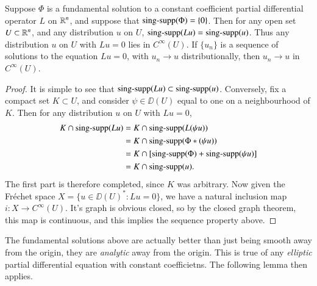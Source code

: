 \begin{lemma}
    Suppose $\Phi$ is a fundamental solution to a constant coefficient partial differential operator $L$ on $\operatorname{\mathbb{R}}^n$, and suppose that $\operatorname{\text{sing-supp}}(\Phi) = \{ 0 \}$. Then for any open set $U \subset \operatorname{\mathbb{R}}^n$, and any distribution $u$ on $U$, $\operatorname{\text{sing-supp}}(Lu) = \operatorname{\text{sing-supp}}(u)$. Thus any distribution $u$ on $U$ with $Lu = 0$ lies in $C^\infty(U)$. If $\{ u_n \}$ is a sequence of solutions to the equation $Lu = 0$, with $u_n \to u$ distributionally, then $u_n \to u$ in $C^\infty(U)$.
\end{lemma}
\begin{proof}
    It is simple to see that $\operatorname{\text{sing-supp}}(Lu) \subset \operatorname{\text{sing-supp}}(u)$. Conversely, fix a compact set $K \subset U$, and consider $\psi \in \DD(U)$ equal to one on a neighbourhood of $K$. Then for any distribution $u$ on $U$ with $Lu = 0$,
    \begin{align*}
        K \cap \operatorname{\text{sing-supp}}(Lu) &= K \cap \operatorname{\text{sing-supp}}(L(\psi u))\\
        &= K \cap \operatorname{\text{sing-supp}}(\Phi * (\psi u))\\
        &= K \cap [\operatorname{\text{sing-supp}}(\Phi) + \operatorname{\text{sing-supp}}(\psi u)]\\
        &= K \cap \operatorname{\text{sing-supp}}(u).
    \end{align*}
    The first part is therefore completed, since $K$ was arbitrary. Now given the Fr\'{e}chet space $X = \{ u \in \DD(U)^* : Lu = 0 \}$, we have a natural inclusion map $i: X \to C^\infty(U)$. It's graph is obvious closed, so by the closed graph theorem, this map is continuous, and this implies the sequence property above.
\end{proof}

The fundamental solutions above are actually better than just being smooth away from the origin, they are \emph{analytic} away from the origin. This is true of any \emph{elliptic} partial differential equation with constant coefficietns. The following lemma then applies.

